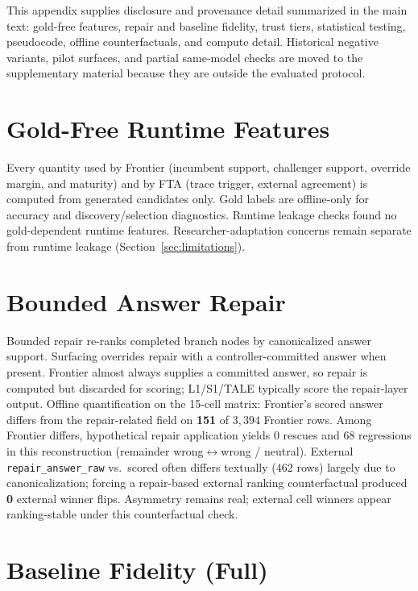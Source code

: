 This appendix supplies disclosure and provenance detail summarized in the main text: gold-free
features, repair and baseline fidelity, trust tiers, statistical testing, pseudocode, offline
counterfactuals, and compute detail. Historical negative variants, pilot surfaces, and partial
same-model checks are moved to the supplementary material because they are outside the evaluated
protocol.

\section{Gold-Free Runtime Features}
\label{app:leakage}

Every quantity used by Frontier (incumbent support, challenger support, override margin, and
maturity) and by FTA (trace trigger, external agreement) is computed from generated candidates
only. Gold labels are offline-only for accuracy and discovery/selection diagnostics. Runtime
leakage checks found no gold-dependent runtime features. Researcher-adaptation concerns remain
separate from runtime leakage (Section~\ref{sec:limitations}).

\section{Bounded Answer Repair}
\label{app:repair}

Bounded repair re-ranks completed branch nodes by canonicalized answer support. Surfacing overrides
repair with a controller-committed answer when present. Frontier almost always supplies a committed
answer, so repair is computed but discarded for scoring; L1/S1/TALE typically score the repair-layer
output. Offline quantification on the 15-cell matrix: Frontier's scored answer differs from the
repair-related field on \textbf{151} of $3{,}394$ Frontier rows. Among Frontier differs,
hypothetical repair application yields 0 rescues and 68 regressions in this reconstruction
(remainder wrong$\leftrightarrow$wrong / neutral).
External \texttt{repair\_answer\_raw} vs.\ scored often differs textually ($462$ rows) largely due to
canonicalization; forcing a repair-based external ranking counterfactual produced \textbf{0} external
winner flips. Asymmetry remains real; external cell winners appear ranking-stable under this
counterfactual check.

\section{Baseline Fidelity (Full)}
\label{app:baselines}

